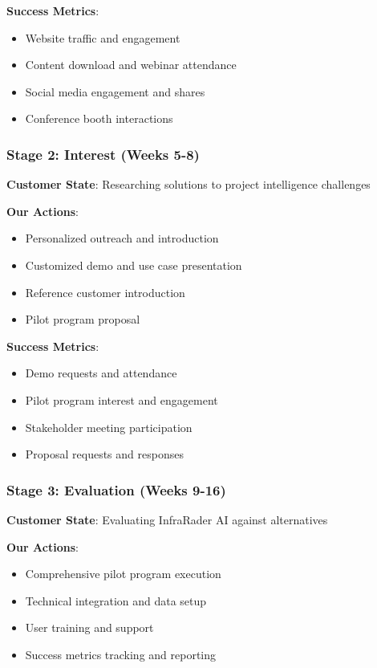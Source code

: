 \documentclass[business]{../templates/infraradar-main}
\begin{document}
\textbf{Success Metrics}:
\begin{itemize}
    \item Website traffic and engagement
    \item Content download and webinar attendance
    \item Social media engagement and shares
    \item Conference booth interactions
\end{itemize}

\subsubsection{Stage 2: Interest (Weeks 5-8)}
\textbf{Customer State}: Researching solutions to project intelligence challenges

\textbf{Our Actions}:
\begin{itemize}
    \item Personalized outreach and introduction
    \item Customized demo and use case presentation
    \item Reference customer introduction
    \item Pilot program proposal
\end{itemize}

\textbf{Success Metrics}:
\begin{itemize}
    \item Demo requests and attendance
    \item Pilot program interest and engagement
    \item Stakeholder meeting participation
    \item Proposal requests and responses
\end{itemize}

\subsubsection{Stage 3: Evaluation (Weeks 9-16)}
\textbf{Customer State}: Evaluating InfraRader AI against alternatives

\textbf{Our Actions}:
\begin{itemize}
    \item Comprehensive pilot program execution
    \item Technical integration and data setup
    \item User training and support
    \item Success metrics tracking and reporting
\end{itemize}
\end{document}
